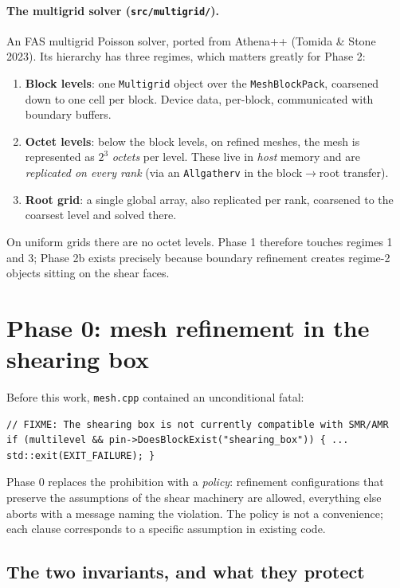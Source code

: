 \documentclass[11pt]{article}
\newcommand{\code}[1]{\texttt{#1}}
\newcommand{\file}[1]{\texttt{\small #1}}
\begin{document}
\paragraph{The multigrid solver (\file{src/multigrid/}).}
An FAS multigrid Poisson solver, ported from Athena++ (Tomida \& Stone 2023). Its
hierarchy has three regimes, which matters greatly for Phase 2:
\begin{enumerate}
\item \textbf{Block levels}: one \code{Multigrid} object over the \code{MeshBlockPack},
      coarsened down to one cell per block. Device data, per-block, communicated with
      boundary buffers.
\item \textbf{Octet levels}: below the block levels, on refined meshes, the mesh is
      represented as $2^3$ \emph{octets} per level. These live in \emph{host} memory
      and are \emph{replicated on every rank} (via an \code{Allgatherv} in the
      block$\to$root transfer).
\item \textbf{Root grid}: a single global array, also replicated per rank, coarsened
      to the coarsest level and solved there.
\end{enumerate}
On uniform grids there are no octet levels. Phase 1 therefore touches regimes 1 and 3;
Phase 2b exists precisely because boundary refinement creates regime-2 objects sitting
on the shear faces.

\section{Phase 0: mesh refinement in the shearing box}
\label{sec:phase0}

Before this work, \file{mesh.cpp} contained an unconditional fatal:

\begin{lstlisting}
// FIXME: The shearing box is not currently compatible with SMR/AMR
if (multilevel && pin->DoesBlockExist("shearing_box")) { ... std::exit(EXIT_FAILURE); }
\end{lstlisting}

Phase 0 replaces the prohibition with a \emph{policy}: refinement configurations that
preserve the assumptions of the shear machinery are allowed, everything else aborts
with a message naming the violation. The policy is not a convenience; each clause
corresponds to a specific assumption in existing code.

\subsection{The two invariants, and what they protect}
\label{sec:invariants}
\end{document}
